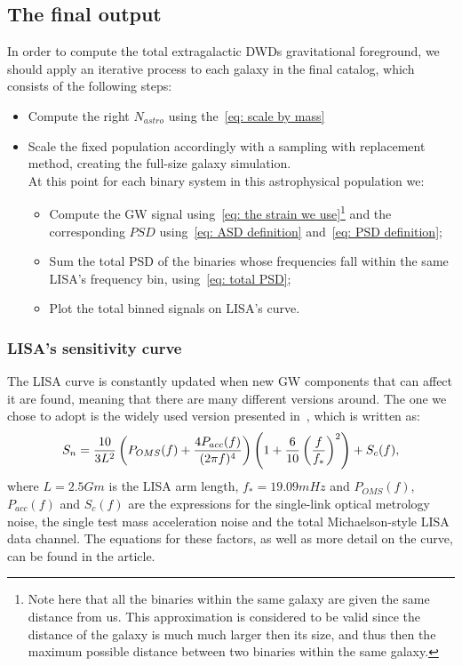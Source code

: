 \subsection{The final output}
In order to compute the total extragalactic DWDs gravitational foreground, we {should} apply an iterative process to each galaxy in the final catalog, which consists of the following steps:
\begin{itemize}
    \item Compute the right $N_{astro}$ using the~\eqref{eq: scale by mass}
    \item Scale the fixed population accordingly with a sampling with replacement method, creating the full-size galaxy simulation.
    \vspace{1.5mm}\\
    At this point for each binary system in this astrophysical population we:
    \begin{itemize}
        \item Compute the GW signal using~\eqref{eq: the strain we use}\footnote{Note here that all the binaries within the same galaxy are given the same distance from us. This approximation is considered to be valid since the distance of the galaxy is much much {large}r then its size, and thus then the maximum possible distance between two binaries within the same galaxy.} and the corresponding $PSD$ using~\eqref{eq: ASD definition} and~\eqref{eq: PSD definition};
        \item Sum the total PSD of the binaries whose frequencies fall within the same LISA's frequency bin, using~\eqref{eq: total PSD};
        \item Plot the total binned signals on LISA's curve.
    \end{itemize}
\end{itemize}
\subsubsection{LISA's sensitivity curve}
The LISA curve is constantly updated when new GW components that can affect it are found, meaning that there are many different versions around.
The one we chose to adopt is the widely used version presented in~\cite{Robson_2019}, which is written as:
\begin{equation}
    S_n = \frac{10}{3L^2} \left( P_{OMS}(f) + \frac{4P_{acc}(f)}{(2\pi f)^4} \right)\left( 1 + \frac{6}{10}\left(\frac{f}{f_*}\right)^2 \right) + S_c(f),
    \notag
\end{equation}
where $L=2.5 Gm$ is the LISA arm length, $f_*=19.09mHz$ and $P_{OMS}(f)$, $P_{acc}(f)$ and $S_c(f)$ are the expressions for the single-link optical metrology noise, the single test mass acceleration noise and the total Michaelson-style LISA data channel. 
The equations for these factors, as well as more detail on the curve, can be found in the article.


